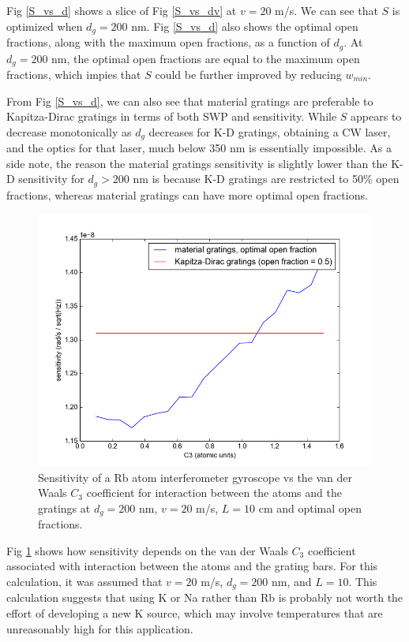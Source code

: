 \documentclass[twocolumn,pra,showpacs,superscriptaddress,longbibliography]{revtex4-1}   %
\begin{document}
Fig \ref{S_vs_d} shows a slice of Fig \ref{S_vs_dv} at $v=20$ m/s. We can see that $S$ is optimized when $d_g=200$ nm. Fig \ref{S_vs_d} also shows the optimal open fractions, along with the maximum open fractions, as a function of $d_g$.  At $d_g=200$ nm, the optimal open fractions are equal to the maximum open fractions, which impies that $S$ could be further improved by reducing $w_{min}$. 

From Fig \ref{S_vs_d}, we can also see that material gratings are preferable to Kapitza-Dirac gratings in terms of both SWP and sensitivity. While $S$ appears to decrease monotonically as $d_g$ decreases for K-D gratings, obtaining a CW laser, and the optics for that laser, much below 350 nm is essentially impossible. As a side note, the reason the material gratings sensitivity is slightly lower than the K-D sensitivity for $d_g > 200$ nm is because K-D gratings are restricted to 50\% open fractions, whereas material gratings can have more optimal open fractions.


\begin{figure}
\includegraphics[width=\linewidth,keepaspectratio]{../plots/S_vs_C3_d200nm_v20_L10cm.png}
\caption{\label{S_vs_C3} Sensitivity of a Rb atom interferometer gyroscope vs the van der Waals $C_3$ coefficient for interaction between the atoms and the gratings at $d_g=200$ nm, $v=20$ m/s, $L=10$ cm and optimal open fractions.}
\end{figure}

Fig \ref{S_vs_C3} shows how sensitivity depends on the van der Waals $C_3$ coefficient associated with interaction between the atoms and the grating bars. For this calculation, it was assumed that $v=20$ m/s, $d_g=200$ nm, and $L = 10$. This calculation suggests that using K or Na rather than Rb is probably not worth the effort of developing a new K source, which may involve temperatures that are unreasonably high for this application. 
\end{document}
